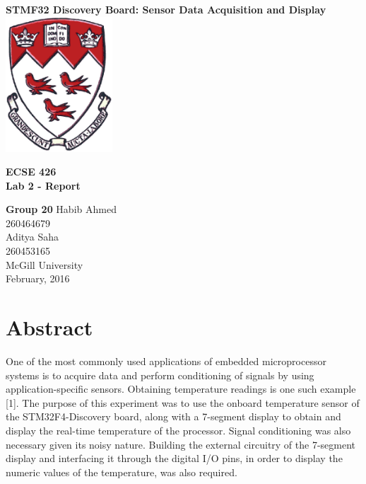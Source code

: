 \documentclass{article}
\begin{document}
\begin{titlepage}
    \centering
    \vfill
    {\bfseries\Large STMF32 Discovery Board: Sensor Data Acquisition and Display}    
    \vskip2cm
    \includegraphics[width=4cm]{mcgill_logo.png}
    
    \vskip2cm
    \large\textbf{ECSE 426} \\
    \large\textbf{Lab 2 - Report} \\
	\vskip0.2cm

    \vskip1.3cm
    \textbf{Group 20}
    \vskip0.2cm
      Habib Ahmed \\
      260464679 \\
    \vskip0.4cm
      Aditya Saha \\
      260453165 \\
    \vskip0.5cm
	McGill University \\
    February, 2016
    \vfill
\end{titlepage}
\newpage

\tableofcontents
\newpage

\section{Abstract}
One of the most commonly used applications of embedded microprocessor systems is to acquire data and perform conditioning of signals by using application-specific sensors. Obtaining temperature readings is one such example [1]. The purpose of this experiment was to use the onboard temperature sensor of the STM32F4-Discovery board, along with a 7-segment display to obtain and display the real-time temperature of the processor. Signal conditioning was also necessary given its noisy nature. Building the external circuitry of the 7-segment display and interfacing it through the digital I/O pins, in order to display the numeric values of the temperature, was also required.  
\end{document}

